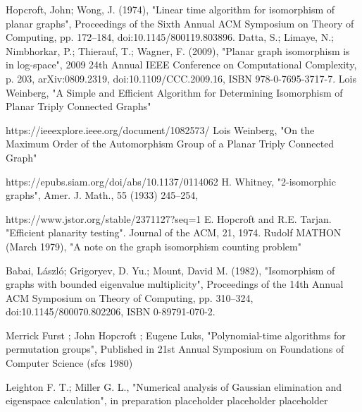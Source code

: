 \begin{thebibliography}{99}
     Hopcroft, John; Wong, J. (1974), 
    "Linear time algorithm for isomorphism of planar graphs", 
    Proceedings of the Sixth Annual ACM Symposium on Theory of Computing, 
    pp. 172–184, doi:10.1145/800119.803896.
     Datta, S.; Limaye, N.; Nimbhorkar, P.; Thierauf, T.; Wagner, F. (2009), 
    "Planar graph isomorphism is in log-space", 
    2009 24th Annual IEEE Conference on Computational Complexity, 
    p. 203, arXiv:0809.2319, doi:10.1109/CCC.2009.16, ISBN 978-0-7695-3717-7.
     Lois Weinberg,
    "A Simple and Efficient Algorithm for Determining Isomorphism  of Planar Triply Connected Graphs"
    
    https://ieeexplore.ieee.org/document/1082573/
     Lois Weinberg,
    "On the Maximum Order of the Automorphism Group of a Planar Triply Connected Graph"
    
    https://epubs.siam.org/doi/abs/10.1137/0114062
      H. Whitney, 
    "2-isomorphic graphs",  
    Amer. J. Math., 55 (1933) 245–254, 

    https://www.jstor.org/stable/2371127?seq=1
     E. Hopcroft and R.E. Tarjan. 
    "Efficient planarity testing".
    Journal of the ACM, 21, 1974.
     Rudolf MATHON (March 1979),
    "A note on the graph isomorphism counting problem"

     Babai, László; Grigoryev, D. Yu.; Mount, David M. (1982), 
    "Isomorphism of graphs with bounded eigenvalue multiplicity", 
    Proceedings of the 14th Annual ACM Symposium on Theory of Computing, 
    pp. 310–324, doi:10.1145/800070.802206, ISBN 0-89791-070-2.
    
     Merrick Furst ; John Hopcroft ; Eugene Luks,
    "Polynomial-time algorithms for permutation groups",
    Published in 21st Annual Symposium on Foundations of Computer Science (sfcs 1980)
    
     Leighton F. T.; Miller G. L.,
    "Numerical analysis of Gaussian elimination and eigenspace calculation",
    in preparation
    \bibitem{} placeholder
    \bibitem{} placeholder
    \bibitem{} placeholder
\end{thebibliography}